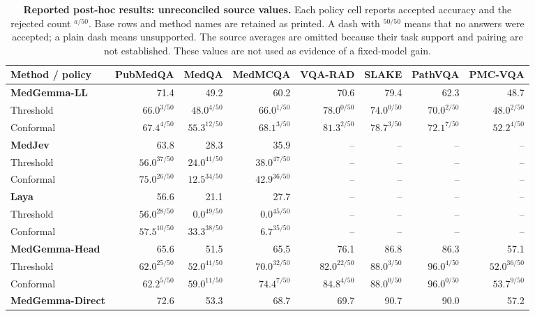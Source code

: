 \begin{table}[p]
\centering\scriptsize\setlength{\tabcolsep}{4pt}\renewcommand{\arraystretch}{1.22}
\caption{\textbf{Reported post-hoc results: unreconciled source values.} Each policy cell reports accepted accuracy and the rejected count $^{a/50}$. Base rows and method names are retained as printed. A dash with $^{50/50}$ means that no answers were accepted; a plain dash means unsupported. The source averages are omitted because their task support and pairing are not established. These values are not used as evidence of a fixed-model gain.}
\label{tab:reportedpolicies}
\begin{tabular*}{\linewidth}{@{\extracolsep{\fill}}lrrrrrrr@{}}
\toprule
\textbf{Method / policy} & PubMedQA & MedQA & MedMCQA & VQA-RAD & SLAKE & PathVQA & PMC-VQA\\
\midrule
\textbf{MedGemma-LL} & 71.4 & 49.2 & 60.2 & 70.6 & 79.4 & 62.3 & 48.7\\
\quad Threshold & $66.0^{3/50}$ & $48.0^{4/50}$ & $66.0^{1/50}$ & $78.0^{0/50}$ & $74.0^{0/50}$ & $70.0^{2/50}$ & $48.0^{2/50}$\\
\quad Conformal & $67.4^{4/50}$ & $55.3^{12/50}$ & $68.1^{3/50}$ & $81.3^{2/50}$ & $78.7^{3/50}$ & $72.1^{7/50}$ & $52.2^{4/50}$\\
\addlinespace[4pt]
\textbf{MedJev} & 63.8 & 28.3 & 35.9 & -- & -- & -- & --\\
\quad Threshold & $56.0^{37/50}$ & $24.0^{41/50}$ & $38.0^{47/50}$ & -- & -- & -- & --\\
\quad Conformal & $75.0^{26/50}$ & $12.5^{34/50}$ & $42.9^{36/50}$ & -- & -- & -- & --\\
\addlinespace[4pt]
\textbf{Laya} & 56.6 & 21.1 & 27.7 & -- & -- & -- & --\\
\quad Threshold & $56.0^{28/50}$ & $0.0^{49/50}$ & $0.0^{45/50}$ & -- & -- & -- & --\\
\quad Conformal & $57.5^{10/50}$ & $33.3^{38/50}$ & $6.7^{35/50}$ & -- & -- & -- & --\\
\addlinespace[4pt]
\textbf{MedGemma-Head} & 65.6 & 51.5 & 65.5 & 76.1 & 86.8 & 86.3 & 57.1\\
\quad Threshold & $62.0^{25/50}$ & $52.0^{41/50}$ & $70.0^{32/50}$ & $82.0^{22/50}$ & $88.0^{3/50}$ & $96.0^{4/50}$ & $52.0^{36/50}$\\
\quad Conformal & $62.2^{5/50}$ & $59.0^{11/50}$ & $74.4^{7/50}$ & $84.8^{4/50}$ & $88.0^{0/50}$ & $96.0^{0/50}$ & $53.7^{9/50}$\\
\addlinespace[4pt]
\textbf{MedGemma-Direct} & 72.6 & 53.3 & 68.7 & 69.7 & 90.7 & 90.0 & 57.2\\

\end{tabular*}
\end{table}

